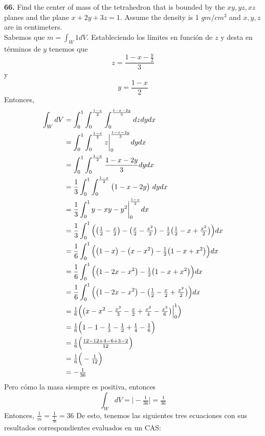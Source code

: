 \documentclass[11pt]{report}
\begin{document}
\textbf{66.} Find the center of mass of the tetrahedron that is bounded by the
$xy, yz, xz$ planes and the plane $x + 2y + 3z = 1$. Assume the density is
1 $gm/cm^3$ and $x, y, z$ are in centimeters. \\
Sabemos que $m = \int_W 1dV$. Estableciendo los límites en función de $z$ y desta en
términos de $y$
tenemos que
$$z=\frac{1-x-\tfrac{y}{2}}{3}$$ y
$$y=\frac{1-x}{2}$$
Entonces,
\begin{equation}
	\begin{split}
		\int_WdV&=\int_0^1\tsint{\frac{1-x}{2}}\tsint{\frac{1-x-2y}{3}}dzdydx\\
			    &=\int_0^1\tsint{\frac{1-x}{2}}z\bigg|_0^{\frac{1-x-2y}{3}}dydx\\
				&=\int_0^1\tsint{\frac{1-x}{2}}\frac{1-x-2y}{3}dydx\\
				&=\frac{1}{3}\int_0^1\tsint{\frac{1-x}{2}}\bp{1-x-2y}\ dydx\\
				&=\frac{1}{3}\int_0^1y-xy-y^2\bigg|_0^{\frac{1-x}{2}}dx\\
				&=\frac{1}{3}\int_0^1\Bp{\bp{\tfrac{1}{2}-\tfrac{x}{2}}-\bp{\tfrac{x}{2}
					-\tfrac{x^2}{2}}-\tfrac{1}{2}\bp{\tfrac{1}{2}-x+\tfrac{x^2}{2}}}dx\\
				&=\frac{1}{6}\int_0^1\Bp{\bp{1-x}-\bp{x-x^2}-\tfrac{1}{2}\bp{1-x+x^2}}dx\\
				&=\frac{1}{6}\int_0^1\Bp{\bp{1-2x-x^2}-\tfrac{1}{2}\bp{1-x+x^2}}dx\\
				&=\frac{1}{6}\int_0^1\Bp{\bp{1-2x-x^2}-\bp{\tfrac{1}{2}-\tfrac{x}{2}+\tfrac{x^2}{2}}}dx\\
				&=\tfrac{1}{6}\Bp{\bp{x-x^2-\tfrac{x^3}{3}-\tfrac{x}{2}+\tfrac{x^2}{4}
					-\tfrac{x^3}{6}}\Big|_0^1}\\
				&=\tfrac{1}{6}\Bp{1-1-\tfrac{1}{3}-\tfrac{1}{2}+\tfrac{1}{4}-\tfrac{1}{6}}\\
				&=\tfrac{1}{6}\Bp{\tfrac{12-12+4-6+3-2}{12}}\\
				&=\tfrac{1}{6}\Bp{-\tfrac{1}{12}}\\
				&=-\tfrac{1}{36}\\
	\end{split}
\end{equation}
Pero cómo la masa siempre es positiva, entonces
\[\int_WdV=\Big|-\tfrac{1}{36}\Big|=\tfrac{1}{36}\]
Entonces, $\frac{1}{m}=\frac{1}{\frac{1}{36}}=36$
De esto, tenemos las siguientes tres ecuaciones con sus resultados correspondientes
evaluados en un CAS:
\end{document}
